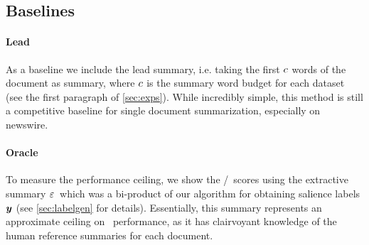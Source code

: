 \subsection{Baselines}
\paragraph{Lead} As a baseline we include the lead summary, i.e. taking the first 
$c$ words of the document as summary, where $c$ is the 
summary word budget for each dataset (see the 
first paragraph of \autoref{sec:exps}). While incredibly simple, this method is still a 
competitive baseline for single document summarization, especially on newswire.
\paragraph{Oracle} To measure the performance ceiling,
we show the \rouge/\meteor~scores using the 
extractive summary $\varepsilon$~which was a bi-product of our algorithm
for obtaining salience labels $\boldsymbol{y}$ (see \autoref{sec:labelgen} for details). Essentially, this summary represents
an approximate ceiling on \rouge~performance, as it has clairvoyant
knowledge
of the human reference summaries for each document.











